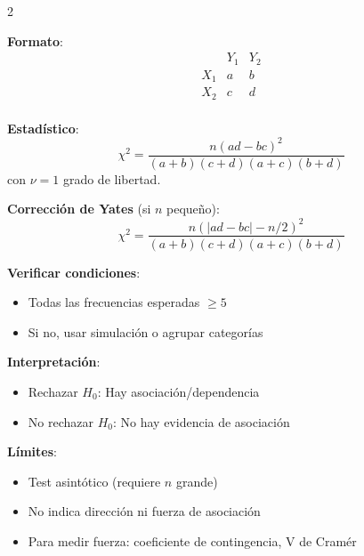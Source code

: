 \documentclass[10pt,a4paper]{article}
\begin{document}
\begin{multicols}{2}
    \begin{tcolorbox}[title=Tabla $2 \times 2$: Caso Especial, equal height group=IH4]
        \textbf{Formato}:
        \[
        \begin{array}{c|cc}
        & Y_1 & Y_2 \\
        \hline
        X_1 & a & b \\
        X_2 & c & d \\
        \end{array}
        \]
        
        \textbf{Estadístico}:
        \[
        \chi^2 = \frac{n(ad - bc)^2}{(a+b)(c+d)(a+c)(b+d)}
        \]
        con $\nu = 1$ grado de libertad.
        
        \textbf{Corrección de Yates} (si $n$ pequeño):
        \[
        \chi^2 = \frac{n(|ad - bc| - n/2)^2}{(a+b)(c+d)(a+c)(b+d)}
        \]
    \end{tcolorbox}
    \begin{tcolorbox}[title=Consideraciones Finales, equal height group=IH4]
        \textbf{Verificar condiciones}:
        \begin{itemize}
            \item Todas las frecuencias esperadas $\geq 5$
            \item Si no, usar simulación o agrupar categorías
        \end{itemize}
        
        \textbf{Interpretación}:
        \begin{itemize}
            \item Rechazar $H_0$: Hay asociación/dependencia
            \item No rechazar $H_0$: No hay evidencia de asociación
        \end{itemize}
        
        \textbf{Límites}:
        \begin{itemize}
            \item Test asintótico (requiere $n$ grande)
            \item No indica dirección ni fuerza de asociación
            \item Para medir fuerza: coeficiente de contingencia, V de Cramér
        \end{itemize}
    \end{tcolorbox}
\end{multicols}

\pagebreak
\end{document}
